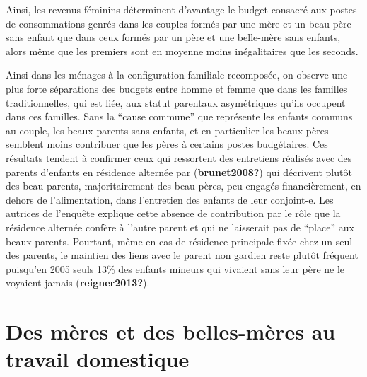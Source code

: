 \documentclass[
  12pt,
]{book}
\begin{document}
Ainsi, les revenus féminins déterminent d'avantage le budget consacré
aux postes de consommations genrés dans les couples formés par une mère
et un beau père sans enfant que dans ceux formés par un père et une
belle-mère sans enfants, alors même que les premiers sont en moyenne
moins inégalitaires que les seconds.

Ainsi dans les ménages à la configuration familiale recomposée, on
observe une plus forte séparations des budgets entre homme et femme que
dans les familles traditionnelles, qui est liée, aux statut parentaux
asymétriques qu'ils occupent dans ces familles. Sans la ``cause
commune'' que représente les enfants communs au couple, les
beaux-parents sans enfants, et en particulier les beaux-pères semblent
moins contribuer que les pères à certains postes budgétaires. Ces
résultats tendent à confirmer ceux qui ressortent des entretiens
réalisés avec des parents d'enfants en résidence alternée par
(\textbf{brunet2008?}) qui décrivent plutôt des beau-parents,
majoritairement des beau-pères, peu engagés financièrement, en dehors de
l'alimentation, dans l'entretien des enfants de leur conjoint-e. Les
autrices de l'enquête explique cette absence de contribution par le rôle
que la résidence alternée confère à l'autre parent et qui ne laisserait
pas de ``place'' aux beaux-parents. Pourtant, même en cas de résidence
principale fixée chez un seul des parents, le maintien des liens avec le
parent non gardien reste plutôt fréquent puisqu'en 2005 seuls 13\% des
enfants mineurs qui vivaient sans leur père ne le voyaient jamais
(\textbf{reigner2013?}).

\section{Des mères et des belles-mères au travail
domestique}\label{des-muxe8res-et-des-belles-muxe8res-au-travail-domestique}
\end{document}
